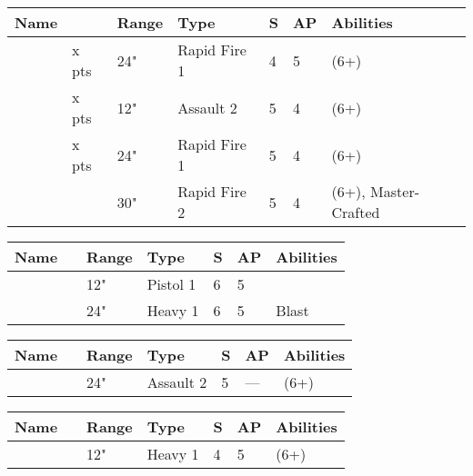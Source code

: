 \label{Gauss Blaster} \label{Gauss Flayer} \label{Gauss Reaper} \label{Relic Gauss Blaster}
\noindent
\begin{tabular}{||m{110pt} m{30pt} m{31pt} m{55pt} m{12pt} m{12pt} m{210pt}||}
	\hline
	Name & & Range & Type & S & AP & Abilities \\
	\hline
	\quickref{Gauss Flayer} & x pts& 24" & Rapid Fire 1 & 4 & 5 & \quickref{Gauss} (6+) \\
	\quickref{Gauss Reaper} & x pts& 12" & Assault 2 & 5 & 4 & \quickref{Gauss} (6+) \\
	\quickref{Gauss Blaster} & x pts& 24" & Rapid Fire 1 & 5 & 4 & \quickref{Gauss} (6+) \\
	\quickref{Relic Gauss Blaster} & & 30" & Rapid Fire 2 & 5 & 4 & \quickref{Gauss} (6+), Master-Crafted \\	
	\hline
\end{tabular}


\label{Particle Caster} \label{Particle Beamer}
\noindent
\begin{tabular}{||m{110pt} m{30pt} m{31pt} m{55pt} m{12pt} m{12pt} m{210pt}||}
	\hline
	Name & & Range & Type & S & AP & Abilities \\
	\hline
	\quickref{Particle Caster} & & 12" & Pistol 1 & 6 & 5 & \\
	\quickref{Particle Beamer} & & 24" & Heavy 1 & 6 & 5 & Blast \\	
	\hline
\end{tabular}

\label{Tesla Carbine}
\noindent
\begin{tabular}{||m{110pt} m{30pt} m{31pt} m{55pt} m{12pt} m{12pt} m{210pt}||}
	\hline
	Name & & Range & Type & S & AP & Abilities \\
	\hline
	\quickref{Tesla Carbine} & & 24" & Assault 2 & 5 & — & \quickref{Tesla} (6+) \\	
	\hline
\end{tabular}


\label{Transdimensional Beamer}
\noindent
\begin{tabular}{||m{110pt} m{30pt} m{31pt} m{55pt} m{12pt} m{12pt} m{210pt}||}
	\hline
	Name & & Range & Type & S & AP & Abilities \\
	\hline
	\quickref{Transdimensional Beamer} & & 12" & Heavy 1 & 4 & 5 & \quickref{Exile Ray} (6+) \\	
	\hline
\end{tabular}


